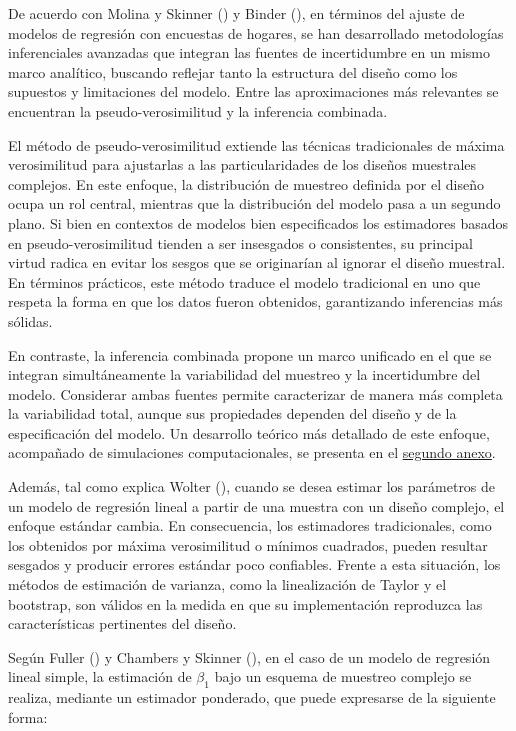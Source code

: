 \documentclass[
  spanish,
  11pt,
  letterpaper,
  oneside,
  open=any]{scrbook}
\begin{document}
De acuerdo con Molina y Skinner ()
y Binder (), en términos del
ajuste de modelos de regresión con encuestas de hogares, se han
desarrollado metodologías inferenciales avanzadas que integran las
fuentes de incertidumbre en un mismo marco analítico, buscando reflejar
tanto la estructura del diseño como los supuestos y limitaciones del
modelo. Entre las aproximaciones más relevantes se encuentran la
pseudo-verosimilitud y la inferencia combinada.

El método de pseudo-verosimilitud extiende las técnicas tradicionales de
máxima verosimilitud para ajustarlas a las particularidades de los
diseños muestrales complejos. En este enfoque, la distribución de
muestreo definida por el diseño ocupa un rol central, mientras que la
distribución del modelo pasa a un segundo plano. Si bien en contextos de
modelos bien especificados los estimadores basados en
pseudo-verosimilitud tienden a ser insesgados o consistentes, su
principal virtud radica en evitar los sesgos que se originarían al
ignorar el diseño muestral. En términos prácticos, este método traduce
el modelo tradicional en uno que respeta la forma en que los datos
fueron obtenidos, garantizando inferencias más sólidas.

En contraste, la inferencia combinada propone un marco unificado en el
que se integran simultáneamente la variabilidad del muestreo y la
incertidumbre del modelo. Considerar ambas fuentes permite caracterizar
de manera más completa la variabilidad total, aunque sus propiedades
dependen del diseño y de la especificación del modelo. Un desarrollo
teórico más detallado de este enfoque, acompañado de simulaciones
computacionales, se presenta en el \hyperref[ap2]{segundo anexo}.

Además, tal como explica Wolter
(), cuando se desea estimar los
parámetros de un modelo de regresión lineal a partir de una muestra con
un diseño complejo, el enfoque estándar cambia. En consecuencia, los
estimadores tradicionales, como los obtenidos por máxima verosimilitud o
mínimos cuadrados, pueden resultar sesgados y producir errores estándar
poco confiables. Frente a esta situación, los métodos de estimación de
varianza, como la linealización de Taylor y el bootstrap, son válidos en
la medida en que su implementación reproduzca las características
pertinentes del diseño.

Según Fuller () y Chambers y
Skinner (), en el caso de un
modelo de regresión lineal simple, la estimación de \(\beta_1\) bajo un
esquema de muestreo complejo se realiza, mediante un estimador
ponderado, que puede expresarse de la siguiente forma:
\end{document}
